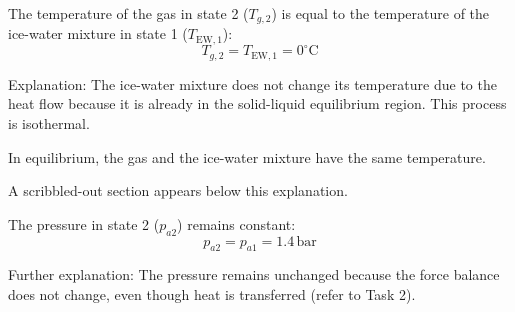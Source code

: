 The temperature of the gas in state 2 (\( T_{g,2} \)) is equal to the temperature of the ice-water mixture in state 1 (\( T_{\text{EW},1} \)):  
\[
T_{g,2} = T_{\text{EW},1} = 0^\circ \text{C}
\]  

Explanation:  
The ice-water mixture does not change its temperature due to the heat flow because it is already in the solid-liquid equilibrium region. This process is isothermal.  

In equilibrium, the gas and the ice-water mixture have the same temperature.  

A scribbled-out section appears below this explanation.  

The pressure in state 2 (\( p_{a2} \)) remains constant:  
\[
p_{a2} = p_{a1} = 1.4 \, \text{bar}
\]  

Further explanation:  
The pressure remains unchanged because the force balance does not change, even though heat is transferred (refer to Task 2).